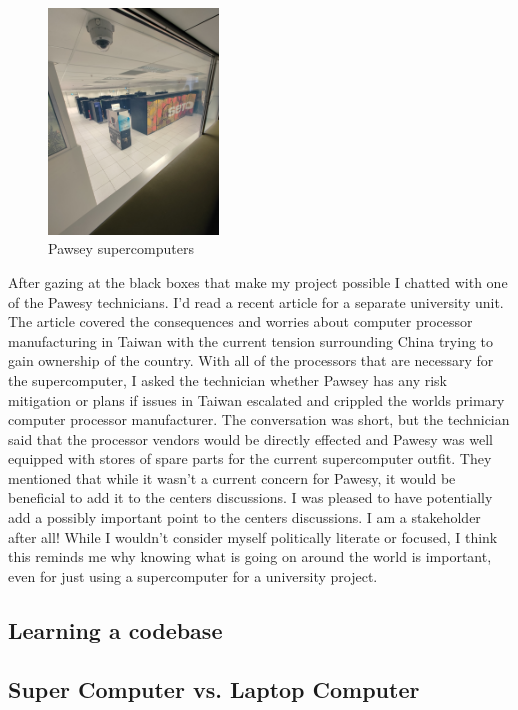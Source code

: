 \documentclass[11pt]{article}
\begin{document}
\begin{figure}[h!]
  \centering
  \includegraphics[height=6cm]{graphics/pawsey}
  \caption{Pawsey supercomputers}
  \label{fig:pawsey}
\end{figure}

After gazing at the black boxes that make my project possible I chatted with one of the Pawesy technicians. I'd read a recent article for a separate university unit. The article covered the consequences and worries about computer processor manufacturing in Taiwan with the current tension surrounding China trying to gain ownership of the country. With all of the processors that are necessary for the supercomputer, I asked the technician whether Pawsey has any risk mitigation or plans if issues in Taiwan escalated and crippled the worlds primary computer processor manufacturer. The conversation was short, but the technician said that the processor vendors would be directly effected and Pawesy was well equipped with stores of spare parts for the current supercomputer outfit. They mentioned that while it wasn't a current concern for Pawesy, it would be beneficial to add it to the centers discussions. I was pleased to have potentially add a possibly important point to the centers discussions. I am a stakeholder after all! While I wouldn't consider myself politically literate or focused, I think this reminds me why knowing what is going on around the world is important, even for just using a supercomputer for a university project.

\subsection{Learning a codebase}
\subsection{Super Computer vs. Laptop Computer}
\end{document}
